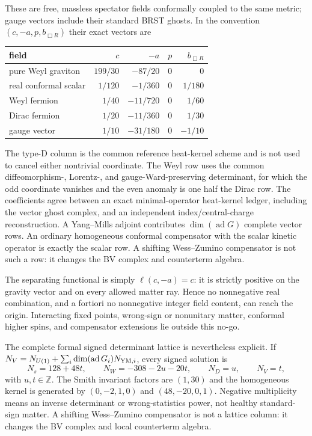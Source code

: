 \documentclass[11pt]{article}
\theoremstyle{definition}
\theoremstyle{remark}
\begin{document}
These are free, massless spectator fields conformally coupled to the same
metric; gauge vectors include their standard BRST ghosts.  In the convention
$(c,-a,p,b_{\Box R})$ their exact vectors are
\begin{center}
\begin{tabular}{@{}lrrrr@{}}
\toprule
field & $c$ & $-a$ & $p$ & $b_{\Box R}$\\
\midrule
pure Weyl graviton & $199/30$ & $-87/20$ & $0$ & $0$\\
real conformal scalar & $1/120$ & $-1/360$ & $0$ & $1/180$\\
Weyl fermion & $1/40$ & $-11/720$ & $0$ & $1/60$\\
Dirac fermion & $1/20$ & $-11/360$ & $0$ & $1/30$\\
gauge vector & $1/10$ & $-31/180$ & $0$ & $-1/10$\\
\bottomrule
\end{tabular}
\end{center}
The type-D column is the common reference heat-kernel scheme and is not used
to cancel either nontrivial coordinate.  The Weyl row uses the common
diffeomorphism-, Lorentz-, and gauge-Ward-preserving determinant, for which
the odd coordinate vanishes and the even anomaly is one half the Dirac row.
The coefficients agree between an exact minimal-operator heat-kernel ledger,
including the vector ghost complex, and an independent index/central-charge
reconstruction.  A Yang--Mills adjoint contributes
$\dim(\operatorname{ad}G)$ complete vector rows.
An ordinary homogeneous conformal compensator with the scalar kinetic
operator is exactly the scalar row.  A shifting Wess--Zumino compensator is
not such a row: it changes the BV complex and counterterm algebra.

The separating functional is simply $\ell(c,-a)=c$: it is strictly positive
on the gravity vector and on every allowed matter ray.  Hence no nonnegative
real combination, and a fortiori no nonnegative integer field content, can
reach the origin.  Interacting fixed points, wrong-sign or nonunitary matter,
conformal higher spins, and compensator extensions lie outside this no-go.

The complete formal signed determinant lattice is nevertheless explicit.  If
$N_V=N_{U(1)}+\sum_i\dim(\operatorname{ad}G_i)N_{{\rm YM},i}$, every signed
solution is
\[
 N_s=128+48t,\qquad N_W=-308-2u-20t,\qquad
 N_D=u,\qquad N_V=t ,
\]
with $u,t\in\mathbb Z$.  The Smith invariant factors are $(1,30)$ and the
homogeneous kernel is generated by $(0,-2,1,0)$ and $(48,-20,0,1)$.
Negative multiplicity means an inverse determinant or wrong-statistics
power, not healthy standard-sign matter.  A shifting Wess--Zumino
compensator is not a lattice column: it changes the BV complex and local
counterterm algebra.
\end{document}
